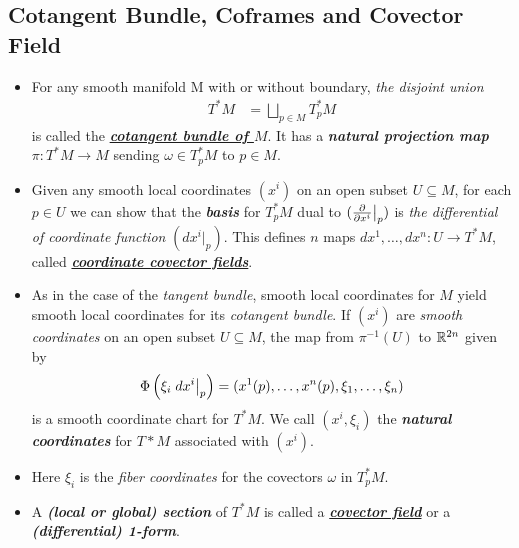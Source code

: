 \documentclass[11pt]{article}
\begin{document}
\subsection{Cotangent Bundle, Coframes and Covector Field}
\begin{itemize}
\item \begin{definition}
For any smooth manifold M with or without boundary, \emph{the disjoint union}
\begin{align*}
T^{*}M &= \bigsqcup_{p \in M}T_{p}^{*}M
\end{align*} is called the \underline{\emph{\textbf{cotangent bundle of $M$}}}. It has a \emph{\textbf{natural projection map}} $\pi: T^{*}M \rightarrow M$ sending $\omega \in T_{p}^{*}M$ to $p \in M$. 
\end{definition}


\item
\begin{definition}
Given any smooth local coordinates $(x^i)$ on an open subset $U \subseteq M$, for each $p \in U$ we can show that the \emph{\textbf{basis}} for $T_{p}^{*}M$ dual to $(\frac{\partial }{ \partial x^{i}}\big|_{p})$ is \emph{the differential of coordinate function} $(dx^{i}\big|_{p})$. This defines $n$ maps $dx^1,\ldots, dx^n: U \rightarrow  T^{*}M$, called \underline{\emph{\textbf{coordinate covector fields}}}.
\end{definition}

\item 
\begin{definition}
As in the case of the \emph{tangent bundle},  smooth local coordinates for $M$ yield smooth local coordinates for its \emph{cotangent bundle}. If $(x^i)$ are \emph{smooth coordinates} on an open subset $U \subseteq M$, the map from $\pi^{-1}(U)$ to ${\mathbb R}^{2n}$ given by
\begin{align*}
\Phi\left(\xi_{i} \;dx^{i}\bigr|_{p}\right) = (x^{1}(p), \ldots, x^{n}(p), \xi_1, \ldots, \xi_n)
\end{align*} is a smooth coordinate chart for $T^{*}M$. We call $(x^i, \xi_i)$ the \emph{\textbf{natural coordinates}} for $T*M$ associated with $(x^i)$. 
\end{definition}

\item \begin{remark}
Here $\xi_{i}$ is the \emph{fiber coordinates} for the covectors $\omega$ in $T_{p}^{*}M$.
\end{remark}

\item
\begin{definition}
A \emph{\textbf{(local or global) section}} of $T^{*}M$ is called a \underline{\emph{\textbf{covector field}}} or a \emph{\textbf{(differential) 1-form}}.
\end{definition}


\end{itemize}
\end{document}
